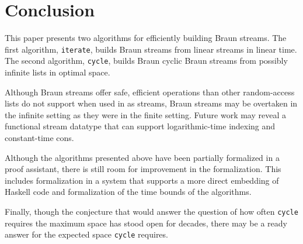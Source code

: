 \documentclass[envcountsect]{llncs}
\begin{document}
\begin{comment}
how many lines?
how many generated lines?
hiccups:
* subtraction
* repeated function application not built-in (show equal to another formulation)
\end{comment}

\section{Conclusion}
\label{conclSect}

This paper presents two algorithms for efficiently building Braun streams.
The first algorithm, {\tt iterate}, builds Braun streams from linear streams in linear time.
The second algorithm, {\tt cycle}, builds Braun cyclic Braun streams from possibly infinite lists in optimal space.

Although Braun streams offer safe, efficient operations than other random-access lists do not support when used in as streams, Braun streams may be overtaken in the infinite setting as they were in the finite setting.
Future work may reveal a functional stream datatype that can support logarithmic-time indexing and constant-time cons.

Although the algorithms presented above have been partially formalized in a proof assistant, there is still room for improvement in the formalization.
This includes formalization in a system that supports a more direct embedding of Haskell code and formalization of the time bounds of the algorithms.

Finally, though the conjecture that would answer the question of how often {\tt cycle} requires the maximum space has stood open for decades, there may be a ready answer for the expected space {\tt cycle} requires.

\begin{comment}
Is there a data structure that provides terminating constant-time \verb|cons|?

Also good for finite Braun trees, because can get index i in time $i$, not $n+i$

Formalizing in a language with extraction

Formalizing time and space complexity

complete formalization

average case space complexity of cycle
\end{comment}



\end{document}
